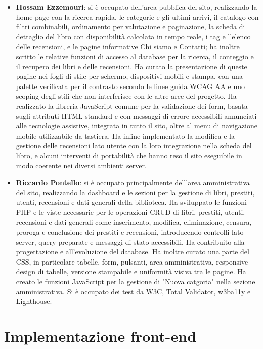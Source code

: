 ﻿\documentclass{article}
\begin{document}
\begin{itemize}
    \item \textbf{Hossam Ezzemouri}: si è occupato dell'area pubblica del sito, realizzando la home page con la ricerca rapida, le categorie e gli ultimi arrivi, il catalogo con filtri combinabili, ordinamento per valutazione e paginazione, la scheda di dettaglio del libro con disponibilità calcolata in tempo reale, i tag e l'elenco delle recensioni, e le pagine informative Chi siamo e Contatti; ha inoltre scritto le relative funzioni di accesso al database per la ricerca, il conteggio e il recupero dei libri e delle recensioni. Ha curato la presentazione di queste pagine nei fogli di stile per schermo, dispositivi mobili e stampa, con una palette verificata per il contrasto secondo le linee guida WCAG AA e uno scoping degli stili che non interferisce con le altre aree del progetto. Ha realizzato la libreria JavaScript comune per la validazione dei form, basata sugli attributi HTML standard e con messaggi di errore accessibili annunciati alle tecnologie assistive, integrata in tutto il sito, oltre al menu di navigazione mobile utilizzabile da tastiera. Ha infine implementato la modifica e la gestione delle recensioni lato utente con la loro integrazione nella scheda del libro, e alcuni interventi di portabilità che hanno reso il sito eseguibile in modo coerente nei diversi ambienti server.
    \item \textbf{Riccardo Pontello}: si è occupato principalmente dell'area amministrativa del sito, realizzando la dashboard e le sezioni per la gestione di libri, prestiti, utenti, recensioni e dati generali della biblioteca. Ha sviluppato le funzioni PHP e le viste necessarie per le operazioni CRUD di libri, prestiti, utenti, recensioni e dati generali come inserimento, modifica, eliminazione, censura, proroga e conclusione dei prestiti e recensioni, introducendo controlli lato server, query preparate e messaggi di stato accessibili. Ha contribuito alla progettazione e all'evoluzione del database. Ha inoltre curato una parte del CSS, in particolare tabelle, form, pulsanti, area amministrativa, responsive design di tabelle, versione stampabile e uniformità visiva tra le pagine. Ha creato le funzioni JavaScript per la gestione di "Nuova catgoria" nella sezione amministrativa. Si è occupato dei test da W3C, Total Validator, w3ba11y e Lighthouse. 
\end{itemize}

\newpage

\section{Implementazione front-end}
\end{document}
